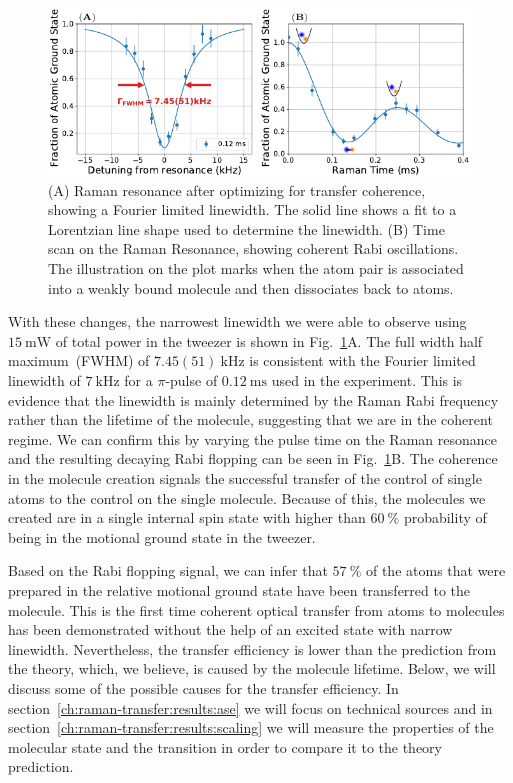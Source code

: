 \begin{figure}
  \centering
  \includegraphics[width=\textwidth]{figures/raman_transfer_fit_one_ase_init.pdf}
  \caption[Raman resonance with Fourier limited linewidth and Rabi flopping.]{
    (A) Raman resonance after optimizing for transfer coherence,
    showing a Fourier limited linewidth.
    The solid line shows a fit to a Lorentzian line shape used to determine the linewidth.
    (B) Time scan on the Raman Resonance, showing coherent Rabi oscillations.
    The illustration on the plot marks when the atom pair is associated into a weakly bound
    molecule and then dissociates back to atoms.
    \label{fig:raman-transfer:results:init}}
\end{figure}

With these changes, the narrowest linewidth we were able to observe using $15~\mathrm{mW}$
of total power in the tweezer is shown in Fig.~\ref{fig:raman-transfer:results:init}A.
The full width half maximum~(FWHM) of $7.45(51)~\mathrm{kHz}$ is consistent
with the Fourier limited linewidth of $7~\mathrm{kHz}$
for a $\pi$-pulse of $0.12~\mathrm{ms}$ used in the experiment.
This is evidence that the linewidth is mainly determined by the Raman Rabi frequency
rather than the lifetime of the molecule, suggesting that we are in the coherent regime.
We can confirm this by varying the pulse time on the Raman resonance
and the resulting decaying Rabi flopping can be seen in
Fig.~\ref{fig:raman-transfer:results:init}B.
The coherence in the molecule creation signals the successful transfer
of the control of single atoms to the control on the single molecule.
Because of this, the molecules we created are in a single internal spin state
with higher than $60~\mathrm{\%}$ probability
of being in the motional ground state in the tweezer.

Based on the Rabi flopping signal, we can infer that $57~\mathrm{\%}$ of the atoms
that were prepared in the relative motional ground state have been transferred to the molecule.
This is the first time coherent optical transfer from atoms to molecules has been demonstrated
without the help of an excited state with narrow linewidth.
Nevertheless, the transfer efficiency is lower than the prediction from the theory,
which, we believe, is caused by the molecule lifetime.
Below, we will discuss some of the possible causes for the transfer efficiency.
In section~\ref{ch:raman-transfer:results:ase} we will focus on technical sources
and in section~\ref{ch:raman-transfer:results:scaling}
we will measure the properties of the molecular state and the transition
in order to compare it to the theory prediction.

